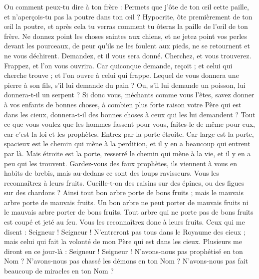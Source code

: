\begin{multicols}{2}
Ou comment peux-tu dire à ton frère : Permets que j'ôte de ton œil cette paille, et n’aperçois-tu pas la poutre dans ton œil ?
Hypocrite, ôte premièrement de ton œil la poutre, et après cela tu verras comment tu ôteras la paille de l’œil de ton frère.
Ne donnez point les choses saintes aux chiens, et ne jetez point vos perles devant les pourceaux, de peur qu'ils ne les foulent aux pieds, ne se retournent et ne vous déchirent.
Demandez, et il vous sera donné. Cherchez, et vous trouverez. Frappez, et l’on vous ouvrira.
Car quiconque demande, reçoit ; et celui qui cherche trouve ; et l’on ouvre à celui qui frappe.
Lequel de vous donnera une pierre à son fils, s'il lui demande du pain ?
Ou, s’il lui demande un poisson, lui donnera-t-il un serpent ?
Si donc vous, méchants comme vous l’êtes, savez donner à vos enfants de bonnes choses, à combien plus forte raison votre Père qui est dans les cieux, donnera-t-il des bonnes choses à ceux qui les lui demandent ?
Tout ce que vous voulez que les hommes fassent pour vous, faites-le de même pour eux, car c’est la loi et les prophètes.
Entrez par la porte étroite. Car large est la porte, spacieux est le chemin qui mène à la perdition, et il y en a beaucoup qui entrent par là.
Mais étroite est la porte, resserré le chemin qui mène à la vie, et il y en a peu qui les trouvent.
Gardez-vous des faux prophètes, ils viennent à vous en habits de brebis, mais au-dedans ce sont des loups ravisseurs.
Vous les reconnaîtrez à leurs fruits. Cueille-t-on des raisins sur des épines, ou des figues sur des chardons ?
Ainsi tout bon arbre porte de bons fruits ; mais le mauvais arbre porte de mauvais fruits.
Un bon arbre ne peut porter de mauvais fruits ni le mauvais arbre porter de bons fruits.
Tout arbre qui ne porte pas de bons fruits est coupé et jeté au feu.
Vous les reconnaîtrez donc à leurs fruits.
Ceux qui me disent : Seigneur ! Seigneur ! N’entreront pas tous dans le Royaume des cieux ; mais celui qui fait la volonté de mon Père qui est dans les cieux.
Plusieurs me diront en ce jour-là : Seigneur ! Seigneur ! N’avons-nous pas prophétisé en ton Nom ? N'avons-nous pas chassé les démons en ton Nom ? N'avons-nous pas fait beaucoup de miracles en ton Nom ?

\end{multicols}

